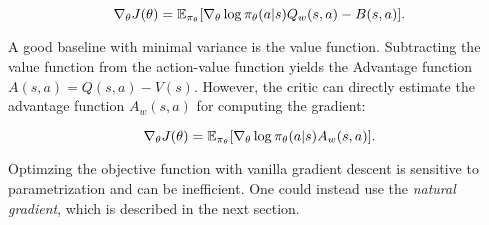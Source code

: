 \begin{equation}
\label{equ:policybaseline}
\nabla_{\theta}J(\theta)=\operatorname{\mathbb{E}}_{\pi_{\theta}}[\nabla_{\theta}\log\pi_{\theta}(a|s) Q_w(s, a) - B(s,a)].
\end{equation}

A good baseline with minimal variance is the value function. Subtracting the value function from the action-value function yields the Advantage function $A(s,a) = Q(s,a)-V(s)$. However, the critic can directly estimate the advantage function $A_w(s,a)$ for computing the gradient:

\begin{equation}
	\nabla_{\theta}J(\theta)=\operatorname{\mathbb{E}}_{\pi_{\theta}}[\nabla_{\theta}\log\pi_{\theta}(a|s) A_w(s, a)].
\end{equation}

Optimzing the objective function with vanilla gradient descent is sensitive to parametrization and can be inefficient. One could instead use the \textit{natural gradient}, which is described in the next section.


